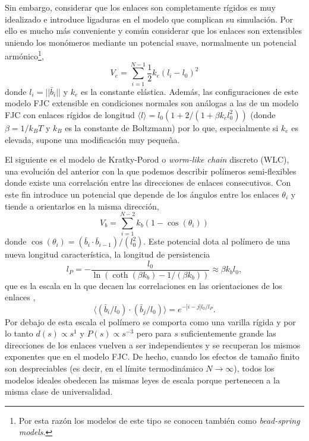 Sin embargo, considerar que los enlaces son completamente rígidos es muy idealizado e introduce ligaduras en el modelo que complican su simulación. Por ello es mucho más conveniente y común considerar que los enlaces son extensibles uniendo los monómeros mediante un potencial suave, normalmente un potencial armónico\footnote{Por esta razón los modelos de este tipo se conocen también como \textit{bead-spring models}.},
\begin{equation}
    \label{eq:Harmonic_Potential}
    V_e=\sum_{i=1}^{N-1}\frac{1}{2}k_e(l_i-l_0)^2
\end{equation}
donde $l_i=||\bar{b}_i||$ y $k_e$ es la constante elástica. Además, las configuraciones de este modelo FJC extensible \cite{Fiasconaro2019} en condiciones normales son análogas a las de un modelo FJC con enlaces rígidos de longitud $\langle l \rangle=l_0(1+2/(1+\beta k_e l_0^2))$ (donde $\beta=1/k_BT$ y $k_B$ es la constante de Boltzmann) por lo que, especialmente si $k_e$ es elevada, supone una modificación muy pequeña.

El siguiente es el modelo de Kratky-Porod o \textit{worm-like chain} discreto (WLC), una evolución del anterior con la que podemos describir polímeros semi-flexibles donde existe una correlación entre las direcciones de enlaces consecutivos. Con este fin introduce un potencial que depende de los ángulos entre los enlaces $\theta_i$ y tiende a orientarlos en la misma dirección,
\begin{equation}
    \label{eq:Bending_Potential}
    V_b=\sum_{i=1}^{N-2} k_b (1-\cos(\theta_i))
\end{equation}
donde $\cos(\theta_i)=(\bar{b}_i\cdot\bar{b}_{i-1})/(l_0^2)$. Este potencial dota al polímero de una nueva longitud característica, la longitud de persistencia
\begin{equation}
    \label{eq:WLC_persistence_length}
    l_P=-\frac{l_0}{\ln(\coth(\beta k_b)-1/(\beta k_b))}\approx\beta k_bl_0,
\end{equation}
que es la escala en la que decaen las correlaciones en las orientaciones de los enlaces \cite{Theodorakopoulos2019},
\begin{equation}
    \label{eq:WLC_correlations}
    \langle (\bar{b}_i/l_0)\cdot(\bar{b}_j/l_0) \rangle=e^{-|i-j|l_0/l_P}.
\end{equation}
Por debajo de esta escala el polímero se comporta como una varilla rígida y por lo tanto $d(s)\propto s^{1}$ y $P(s)\propto s^{-3}$ pero para $s$ suficientemente grande las direcciones de los enlaces vuelven a ser independientes y se recuperan los mismos exponentes que en el modelo FJC. De hecho, cuando los efectos de tamaño finito son despreciables (es decir, en el límite termodinámico $N\to\infty$), todos los modelos ideales obedecen las mismas leyes de escala porque pertenecen a la misma clase de universalidad.

